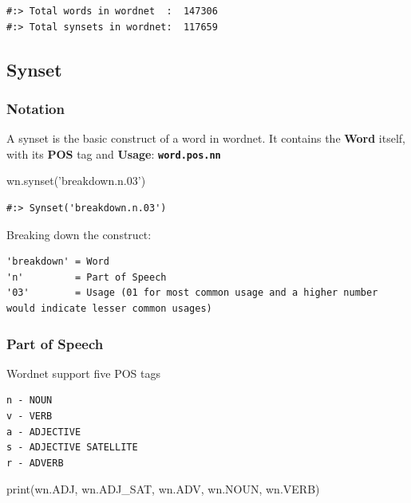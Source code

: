 \documentclass[
]{book}
\newenvironment{Shaded}{\begin{snugshade}}{\end{snugshade}}
\newcommand{\BuiltInTok}[1]{#1}
\newcommand{\NormalTok}[1]{#1}
\newcommand{\StringTok}[1]{\textcolor[rgb]{0.5,0.5,0.5}{#1}}
\begin{document}
\begin{verbatim}
#:> Total words in wordnet  :  147306 
#:> Total synsets in wordnet:  117659
\end{verbatim}

\hypertarget{synset}{%
\subsection{Synset}\label{synset}}

\hypertarget{notation}{%
\subsubsection{Notation}\label{notation}}

A synset is the basic construct of a word in wordnet. It contains the \textbf{Word} itself, with its \textbf{POS} tag and \textbf{Usage}: \textbf{\texttt{word.pos.nn}}

\begin{Shaded}
\begin{Highlighting}[]
\NormalTok{wn.synset(}\StringTok{'breakdown.n.03'}\NormalTok{)}
\end{Highlighting}
\end{Shaded}

\begin{verbatim}
#:> Synset('breakdown.n.03')
\end{verbatim}

Breaking down the construct:

\begin{verbatim}
'breakdown' = Word
'n'         = Part of Speech
'03'        = Usage (01 for most common usage and a higher number would indicate lesser common usages)
\end{verbatim}

\hypertarget{part-of-speech}{%
\subsubsection{Part of Speech}\label{part-of-speech}}

Wordnet support five POS tags

\begin{verbatim}
n - NOUN
v - VERB
a - ADJECTIVE
s - ADJECTIVE SATELLITE
r - ADVERB
\end{verbatim}

\begin{Shaded}
\begin{Highlighting}[]
\BuiltInTok{print}\NormalTok{(wn.ADJ, wn.ADJ_SAT, wn.ADV, wn.NOUN, wn.VERB)}
\end{Highlighting}
\end{Shaded}
\end{document}
